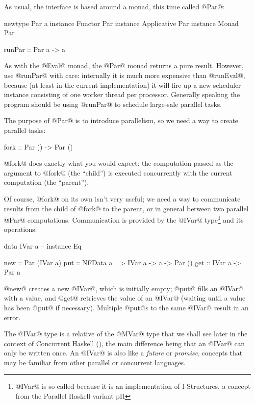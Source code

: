 As usual, the interface is based around a monad, this time called @Par@:

\begin{haskell}
  newtype Par a
  instance Functor Par
  instance Applicative Par
  instance Monad Par

  runPar :: Par a -> a
\end{haskell}

\noindent As with the @Eval@ monad, the @Par@ monad returns a pure
result.  However, use @runPar@ with care: internally it is much more
expensive than @runEval@, because (at least in the current
implementation) it will fire up a new scheduler instance consisting of
one worker thread per processor.  Generally speaking the program
should be using @runPar@ to schedule large-sale parallel tasks.

The purpose of @Par@ is to introduce parallelism, so we need a way to
create parallel tasks:

\begin{haskell}
  fork :: Par () -> Par ()
\end{haskell}

\noindent @fork@ does exactly what you would expect: the computation
passed as the argument to @fork@ (the ``child'') is executed
concurrently with the current computation (the ``parent'').

Of course, @fork@ on its own isn't very useful; we need a way to
communicate results from the child of @fork@ to the parent, or in
general between two parallel @Par@ computations.  Communication is
provided by the @IVar@ type\footnote{@IVar@ is so-called because it is an implementation of
I-Structures, a concept from the Parallel Haskell variant pH} and its operations:

\begin{haskell}
  data IVar a  -- instance Eq

  new :: Par (IVar a)
  put :: NFData a => IVar a -> a -> Par ()
  get :: IVar a -> Par a
\end{haskell}

\noindent @new@ creates a new @IVar@, which is initially empty; @put@
fills an @IVar@ with a value, and @get@ retrieves the value of an
@IVar@ (waiting until a value has been @put@ if necessary).  Multiple
@put@s to the same @IVar@ result in an error.

The @IVar@ type is a relative of the @MVar@ type that we shall see
later in the context of Concurrent Haskell (), the main
difference being that an @IVar@ can only be written once.  An @IVar@
is also like a \emph{future} or \emph{promise}, concepts that may be
familiar from other parallel or concurrent languages.


